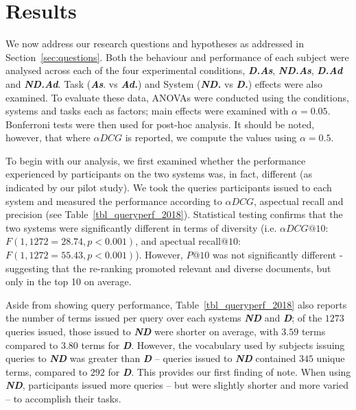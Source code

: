 \section{Results} \label{sec:results}

We now address our research questions and hypotheses as addressed in Section~\ref{sec:questions}. Both the behaviour and performance of each subject were analysed across each of the four experimental conditions, \textbf{\emph{D.As}}, \textbf{\emph{ND.As}}, \textbf{\emph{D.Ad}} and \textbf{\emph{ND.Ad}}. Task (\emph{\textbf{As}}. vs \emph{\textbf{Ad.}}) and System (\emph{\textbf{ND.}} vs \emph{\textbf{D.}}) effects were also examined. To evaluate these data, ANOVAs were conducted using the conditions, systems and tasks each as factors; main effects were examined with $\alpha=0.05$. Bonferroni tests were then used for post-hoc analysis. It should be noted, however, that where $\alpha DCG$ is reported, we compute the values using $\alpha=0.5$.

To begin with our analysis, we first examined whether the performance experienced by participants on the two systems was, in fact, different (as indicated by our pilot study). We took the queries participants issued to each system and measured the performance according to $\alpha DCG$, aspectual recall and precision (see Table~\ref{tbl_queryperf_2018}). Statistical testing confirms that the two systems were significantly different 
 in terms of diversity (i.e. $\alpha DCG@10$: $F(1, 1272=28.74, p<0.001)$, and apectual recall$@10$: $F(1, 1272=55.43, p<0.001)$). However, $P@10$ was not significantly different - suggesting that the re-ranking promoted relevant and diverse documents, but only in the top 10 on average.
 
 Aside from showing query performance, Table~\ref{tbl_queryperf_2018} also reports the number of terms issued per query over each systems \textbf{\emph{ND}} and \textbf{\emph{D}}; of the $1273$ queries issued, those issued to \textbf{\emph{ND}} were shorter on average, with $3.59$ terms compared to $3.80$ terms for \textbf{\emph{D}}. However, the vocabulary used by subjects issuing queries to \textbf{\emph{ND}} was greater than \textbf{\emph{D}} -- queries issued to \textbf{\emph{ND}} contained $345$ unique terms, compared to $292$ for \textbf{\emph{D}}.
This provides our first finding of note. When using \textbf{\emph{ND}}, participants issued more queries -- but were slightly shorter and more varied -- to accomplish their tasks. 


